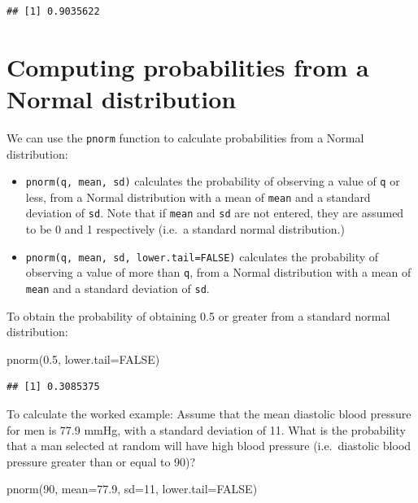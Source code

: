 \documentclass[
]{memoir}
\newenvironment{Shaded}{\begin{snugshade}}{\end{snugshade}}
\newcommand{\AttributeTok}[1]{\textcolor[rgb]{0.77,0.63,0.00}{#1}}
\newcommand{\ConstantTok}[1]{\textcolor[rgb]{0.00,0.00,0.00}{#1}}
\newcommand{\DecValTok}[1]{\textcolor[rgb]{0.00,0.00,0.81}{#1}}
\newcommand{\FloatTok}[1]{\textcolor[rgb]{0.00,0.00,0.81}{#1}}
\newcommand{\FunctionTok}[1]{\textcolor[rgb]{0.00,0.00,0.00}{#1}}
\newcommand{\NormalTok}[1]{#1}
\providecommand{\tightlist}{%
  \setlength{\itemsep}{0pt}\setlength{\parskip}{0pt}}
\begin{document}
\begin{verbatim}
## [1] 0.9035622
\end{verbatim}

\hypertarget{computing-probabilities-from-a-normal-distribution}{%
\section{Computing probabilities from a Normal distribution}\label{computing-probabilities-from-a-normal-distribution}}

We can use the \texttt{pnorm} function to calculate probabilities from a Normal distribution:

\begin{itemize}
\tightlist
\item
  \texttt{pnorm(q,\ mean,\ sd)} calculates the probability of observing a value of \texttt{q} or less, from a Normal distribution with a mean of \texttt{mean} and a standard deviation of \texttt{sd}. Note that if \texttt{mean} and \texttt{sd} are not entered, they are assumed to be 0 and 1 respectively (i.e.~a standard normal distribution.)
\item
  \texttt{pnorm(q,\ mean,\ sd,\ lower.tail=FALSE)} calculates the probability of observing a value of more than \texttt{q}, from a Normal distribution with a mean of \texttt{mean} and a standard deviation of \texttt{sd}.
\end{itemize}

To obtain the probability of obtaining 0.5 or greater from a standard normal distribution:

\begin{Shaded}
\begin{Highlighting}[]
\FunctionTok{pnorm}\NormalTok{(}\FloatTok{0.5}\NormalTok{, }\AttributeTok{lower.tail=}\ConstantTok{FALSE}\NormalTok{)}
\end{Highlighting}
\end{Shaded}

\begin{verbatim}
## [1] 0.3085375
\end{verbatim}

To calculate the worked example: Assume that the mean diastolic blood pressure for men is 77.9 mmHg, with a standard deviation of 11. What is the probability that a man selected at random will have high blood pressure (i.e.~diastolic blood pressure greater than or equal to 90)?

\begin{Shaded}
\begin{Highlighting}[]
\FunctionTok{pnorm}\NormalTok{(}\DecValTok{90}\NormalTok{, }\AttributeTok{mean=}\FloatTok{77.9}\NormalTok{, }\AttributeTok{sd=}\DecValTok{11}\NormalTok{, }\AttributeTok{lower.tail=}\ConstantTok{FALSE}\NormalTok{)}
\end{Highlighting}
\end{Shaded}
\end{document}
